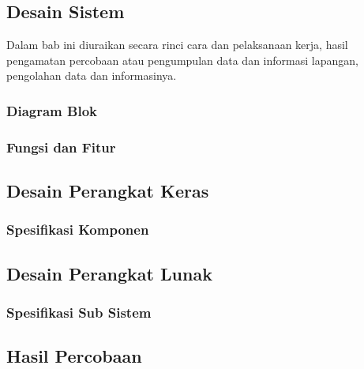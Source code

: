 \documentclass{thesis}
\begin{document}


\subsection{Desain Sistem}

Dalam bab ini diuraikan secara rinci cara dan pelaksanaan kerja, hasil pengamatan percobaan atau pengumpulan data dan informasi lapangan, pengolahan data dan informasinya.

\subsubsection{Diagram Blok}

\subsubsection{Fungsi dan Fitur}

\subsection{Desain Perangkat Keras}

\subsubsection{Spesifikasi Komponen}

\subsection{Desain Perangkat Lunak}

\subsubsection{Spesifikasi Sub Sistem}


\subsection{Hasil Percobaan}
\end{document}
